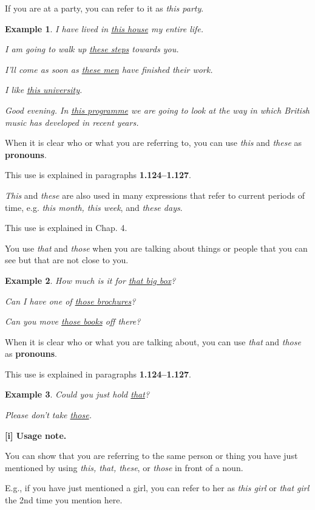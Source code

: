 \documentclass[oneside]{book}
\numberwithin{equation}{section}
\newtheorem{example}{Example}[section]
\begin{document}
If you are at a party, you can refer to it as \textit{this party}.
\begin{example}
    I have lived in \underline{this house} my entire life.
    
    I am going to walk up \underline{these steps} towards you.
    
    I'll come as soon as \underline{these men} have finished their work.
    
    I like \underline{this university}.
    
    Good evening. In \underline{this programme} we are going to look at the way in which British music has developed in recent years.
\end{example}
When it is clear who or what you are referring to, you can use \textit{this} and \textit{these} as \textbf{pronouns}.

This use is explained in paragraphs \textbf{1.124--1.127}.

%
\noindent{} \textit{This} and \textit{these} are also used in many expressions that refer to current periods of time, e.g. \textit{this month, this week}, and \textit{these days}.

This use is explained in Chap. 4.

%
\noindent{} You use \textit{that} and \textit{those} when you are talking about things or people that you can see but that are not close to you.
\begin{example}
    How much is it for \underline{that big box}?
    
    Can I have one of \underline{those brochures}?
    
    Can you move \underline{those books} off there?
\end{example}
%
\noindent{} When it is clear who or what you are talking about, you can use \textit{that} and \textit{those} as \textbf{pronouns}.

This use is explained in paragraphs \textbf{1.124--1.127}.
\begin{example}
    Could you just hold \underline{that}?
    
    Please don't take \underline{those}.
\end{example}
%
\textbf{[i] Usage note.}

%
\noindent{} You can show that you are referring to the same person or thing you have just mentioned by using \textit{this, that, these}, or \textit{those} in front of a noun.

E.g., if you have just mentioned a girl, you can refer to her as \textit{this girl} or \textit{that girl} the 2nd time you mention here.
\end{document}

